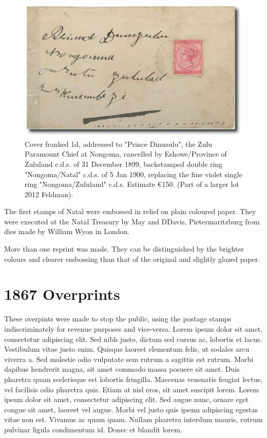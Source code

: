 \begin{figure}[htbp]
\includegraphics[width=.80\textwidth]{../natal/dinuzulu.jpg}
\caption{
Cover franked 1d, addressed to "Prince Dinuzulu", the Zulu Paramount Chief at Nongoma, cancelled by Eshowe/Province of Zululand c.d.s. of 31 December 1899, backstamped double ring "Nongoma/Natal" c.d.s. of 5 Jan 1900, replacing the fine violet single ring "Nongoma/Zululand" c.d.s. Estimate \euro150. (Part of a larger lot 2012 Feldman).}
\end{figure}

The first stamps of Natal were embossed in relief on plain coloured paper. They were executed at the 
Natal Treasury by May and DDavis, Pietermaritzburg from dies made by William Wyon in London.

More than one reprint was made. They can be distinguished by the brighter colours and clearer embossing than that of the 
original and slightly glazed paper.


\section{1867 Overprints}

These overpints were made to stop the public, using the postage stamps indiscriminately for revenue purposes
and vice-versa. Lorem ipsum dolor sit amet, consectetur adipiscing elit. Sed nibh justo, dictum sed cursus ac, lobortis et lacus. Vestibulum vitae justo enim. Quisque laoreet elementum felis, ut sodales arcu viverra a. Sed molestie odio vulputate sem rutrum a sagittis est rutrum. Morbi dapibus hendrerit magna, sit amet commodo massa posuere sit amet. Duis pharetra quam scelerisque est lobortis fringilla. Maecenas venenatis feugiat lectus, vel facilisis odio pharetra quis. Etiam at nisl eros, sit amet suscipit lorem. Lorem ipsum dolor sit amet, consectetur adipiscing elit. Sed augue nunc, ornare eget congue sit amet, laoreet vel augue. Morbi vel justo quis ipsum adipiscing egestas vitae non est. Vivamus ac quam quam. Nullam pharetra
                                                    interdum mauris, rutrum pulvinar ligula condimentum id. Donec et blandit lorem. 

